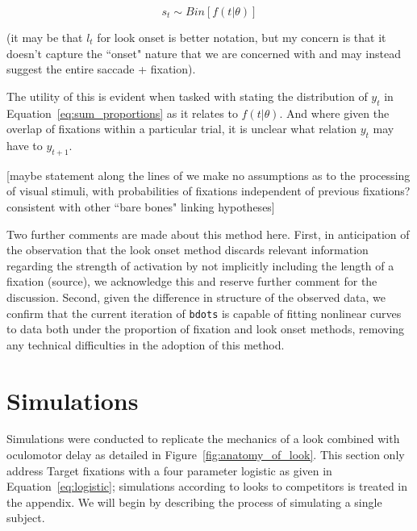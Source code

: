 \documentclass{article}
\newcommand{\xt}{\texttt}%
\begin{document}
\begin{equation} \label{eq:saccade_dist}
s_t \sim Bin[f(t| \theta)]
\end{equation}

(it may be that $l_t$ for look onset is better notation, but my concern is that it doesn't capture the ``onset" nature that we are concerned with and may instead suggest the entire saccade + fixation).

The utility of this is evident when tasked with stating the distribution of $y_t$ in Equation~\ref{eq:sum_proportions} as it relates to $f(t|\theta)$. And where given the overlap of fixations within a particular trial, it is unclear what relation $y_t$ may have to $y_{t+1}$. 

[maybe statement along the lines of we make no assumptions as to the processing of visual stimuli, with probabilities of fixations independent of previous fixations? consistent with other ``bare bones" linking hypotheses]

Two further comments are made about this method here. First, in anticipation of the observation that the look onset method discards relevant information regarding the strength of activation by not implicitly including the length of a fixation (source), we acknowledge this and reserve further comment for the discussion. Second, given the difference in structure of the observed data, we confirm that the current iteration of \xt{bdots} is capable of fitting nonlinear curves to data both under the proportion of fixation and look onset methods, removing any technical difficulties in the adoption of this method.



\section{Simulations}

Simulations were conducted to replicate the mechanics of a look combined with oculomotor delay as detailed in Figure~\ref{fig:anatomy_of_look}. This section only address Target fixations with a four parameter logistic as given in Equation~\ref{eq:logistic}; simulations according to looks to competitors is treated in the appendix. We will begin by describing the process of simulating a single subject.
\end{document}
